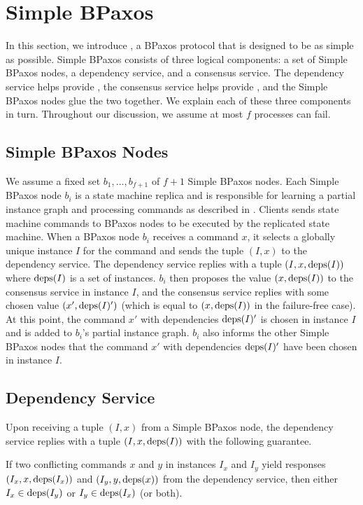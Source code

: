 \section{Simple BPaxos}
In this section, we introduce , a BPaxos protocol that
is designed to be as simple as possible.
%
Simple BPaxos consists of three logical components: a set of Simple BPaxos
nodes, a dependency service, and a consensus service. The dependency service
helps provide , the consensus service helps provide
, and the Simple BPaxos nodes glue the two together.
We explain each of these three components in turn. Throughout our discussion,
we assume at most $f$ processes can fail.

\subsection{Simple BPaxos Nodes}
We assume a fixed set $b_1, \ldots, b_{f+1}$ of $f + 1$ Simple BPaxos nodes.
Each Simple BPaxos node $b_i$ is a state machine replica and is responsible for
learning a partial instance graph and processing commands as described in
.
%
Clients sends state machine commands to BPaxos nodes to be executed by the
replicated state machine. When a BPaxos node $b_i$ receives a command $x$, it
selects a globally unique instance $I$ for the command and sends the tuple $(I,
x)$ to the dependency service. The dependency service replies with a tuple $(I,
x, \text{deps}(I))$ where $\text{deps}(I)$ is a set of instances.
%
$b_i$ then proposes the value $(x, \text{deps}(I))$ to the consensus service in
instance $I$, and the consensus service replies with some chosen value $(x',
\text{deps}(I)')$ (which is equal to $(x, \text{deps}(I))$ in the failure-free case). At
this point, the command $x'$ with dependencies $\text{deps}(I)'$ is chosen in instance
$I$ and is added to $b_i$'s partial instance graph. $b_i$ also informs the
other Simple BPaxos nodes that the command $x'$ with dependencies $\text{deps}(I)'$
have been chosen in instance $I$.

\subsection{Dependency Service}
Upon receiving a tuple $(I, x)$ from a Simple BPaxos node, the dependency
service replies with a tuple $(I, x, \text{deps}(I))$ with the following guarantee.

\begin{invariant}
If two conflicting commands $x$ and $y$ in instances $I_x$ and $I_y$ yield
responses $(I_x, x, \text{deps}(I_x))$ and $(I_y, y, \text{deps}(x))$ from the dependency
service, then either $I_x \in \text{deps}(I_y)$ or $I_y \in \text{deps}(I_x)$ (or both).
\end{invariant}

